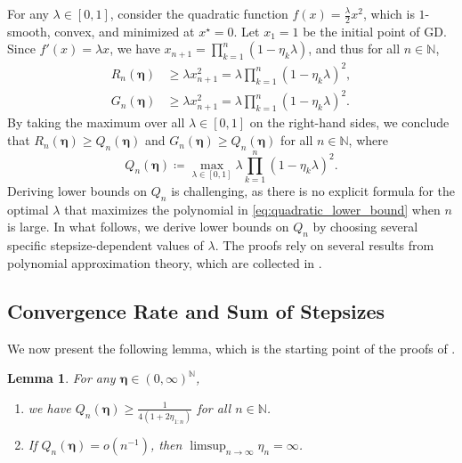\documentclass[11pt]{article}
\newcommand{\N}{\mathbb{N}}
\newcommand{\schedule}{\bm{\eta}}
\newtheorem{lemma}{Lemma}[section]
\begin{document}
For any $\lambda\in[0,1]$, consider the quadratic function $f(x) = \frac{\lambda}{2}x^2$, which is $1$-smooth, convex, and minimized at $x^\star=0$.
Let $x_1=1$ be the initial point of GD.
Since $f'(x) = \lambda x$, we have $x_{n+1} = \prod_{k=1}^n (1-\eta_k\lambda)$, and thus for all $n\in\N$,
\begin{align*}
	R_n(\schedule) &\geq \lambda x_{n+1}^2 = \lambda \prod_{k=1}^n (1 - \eta_k \lambda )^2,
	\\
	G_n(\schedule) &\geq \lambda x_{n+1}^2 = \lambda \prod_{k=1}^n (1 - \eta_k \lambda )^2.
\end{align*}
By taking the maximum over all $\lambda\in[0,1]$ on the right-hand sides, we conclude that $R_n(\schedule)\geq Q_n(\schedule)$ and $G_n(\schedule) \geq Q_n(\schedule)$ for all $n\in\N$, where
\begin{equation}\label{eq:quadratic_lower_bound}
	Q_n(\schedule)
	\coloneqq \max_{\lambda\in[0,1]}\lambda \prod_{k=1}^n (1 - \eta_k \lambda )^2.
\end{equation}
Deriving lower bounds on $Q_n$ is challenging, as there is no explicit formula for the optimal $\lambda$ that maximizes the polynomial in \eqref{eq:quadratic_lower_bound} when $n$ is large.
In what follows, we derive lower bounds on $Q_n$ by choosing several specific stepsize-dependent values of $\lambda$.
The proofs rely on several results from polynomial approximation theory, which are collected in .


\subsection{Convergence Rate and Sum of Stepsizes}

We now present the following lemma, which is the starting point of the proofs of .


\begin{lemma}\label{lem:convergence_rate_lower_bound_by_sum_of_stepsizes}
For any $\schedule\in(0,\infty)^{\N}$,
\begin{enumerate}[label=(\roman*)]
    \item we have $Q_n(\schedule) \geq \frac{1}{4(1+2\eta_{1:n})}$ for all $n\in\N$.
    \item If $Q_n(\schedule) = o(n^{-1})$, then $\limsup_{n\to\infty}\eta_n = \infty$.
\end{enumerate}
\end{lemma}
\end{document}
